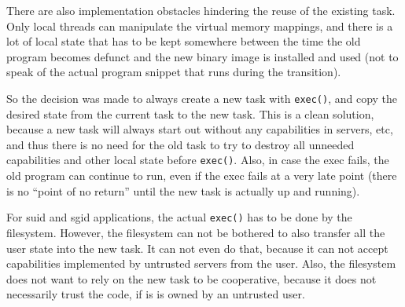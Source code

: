 \begin{comment}
  One could think that if a program is not Hurd-aware, then it will
  not make any use of capabilities except through the normal POSIX
  API, and thus there are no capabilities except those that the GNU C
  library uses itself, which \texttt{exec()} can take care of.
  However, this is only true if code that is not Hurd-aware is never
  mixed with Hurd specific code, even libraries (unless the library
  intimately cooperates with the GNU C library).  This would be a high
  barrier to enable Hurd features in otherwise portable programs and
  libraries.
  
  It is better to make all POSIX functions safe by default and allow
  for extensions to let the user specify which capabilities besides
  those used for file descriptors etc to be inherited by the new
  executable.
  
  For \verb/posix_spawn()/, this is straight-forward.  For
  \texttt{exec()}, it is not. either specific capabilities could be
  markes as ``do not close on \texttt{exec()}'', or variants of the
  \texttt{exec()} function could be provided which take further
  arguments.
\end{comment}

There are also implementation obstacles hindering the reuse of the
existing task.  Only local threads can manipulate the virtual memory
mappings, and there is a lot of local state that has to be kept
somewhere between the time the old program becomes defunct and the new
binary image is installed and used (not to speak of the actual program
snippet that runs during the transition).

So the decision was made to always create a new task with
\texttt{exec()}, and copy the desired state from the current task to
the new task.  This is a clean solution, because a new task will
always start out without any capabilities in servers, etc, and thus
there is no need for the old task to try to destroy all unneeded
capabilities and other local state before \texttt{exec()}.  Also, in
case the exec fails, the old program can continue to run, even if the
exec fails at a very late point (there is no ``point of no return''
until the new task is actually up and running).

For suid and sgid applications, the actual \texttt{exec()} has to be
done by the filesystem.  However, the filesystem can not be bothered
to also transfer all the user state into the new task.  It can not
even do that, because it can not accept capabilities implemented by
untrusted servers from the user.  Also, the filesystem does not want
to rely on the new task to be cooperative, because it does not
necessarily trust the code, if is is owned by an untrusted user.

